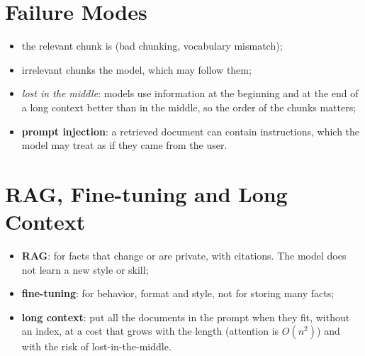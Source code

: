 \section{Failure Modes}
\begin{itemize}
    \item the relevant chunk is  (bad chunking, vocabulary mismatch);
    \item irrelevant chunks  the model, which may follow them;
    \item \emph{lost in the middle}: models use information at the beginning and at the end
        of a long context better than in the middle, so the order of the chunks matters;
    \item \textbf{prompt injection}: a retrieved document can contain instructions, which the
        model may treat as if they came from the user.
\end{itemize}

\section{RAG, Fine-tuning and Long Context}
\begin{itemize}
    \item \textbf{RAG}: for facts that change or are private, with citations. The model does
        not learn a new style or skill;
    \item \textbf{fine-tuning}: for behavior, format and style, not for storing many facts;
    \item \textbf{long context}: put all the documents in the prompt when they fit, without
        an index, at a cost that grows with the length (attention is $O(n^{2})$) and with the
        risk of lost-in-the-middle.
\end{itemize}
